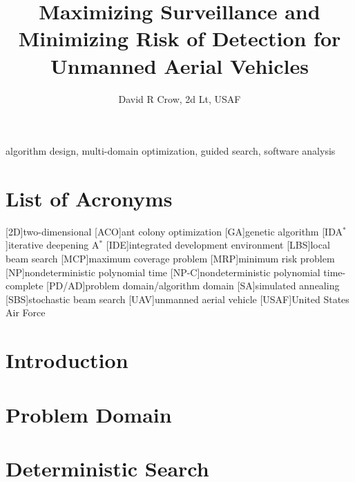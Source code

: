 \documentclass[journal]{IEEEtran}
\title{Maximizing Surveillance and Minimizing Risk of Detection for Unmanned Aerial Vehicles}
\author{David R Crow, 2d Lt, USAF}
\begin{document}
\maketitle



\begin{IEEEkeywords}
    algorithm design, multi-domain optimization, guided search, software analysis
\end{IEEEkeywords}

\tableofcontents

\section*{List of Acronyms}
\begin{acronym}[PD/AD]
    [2D]{two-dimensional}
    [ACO]{ant colony optimization}
    [GA]{genetic algorithm}
    [IDA$^*$]{iterative deepening A$^*$}
    [IDE]{integrated development environment}
    [LBS]{local beam search}
    [MCP]{maximum coverage problem}
    [MRP]{minimum risk problem}
    [NP]{nondeterministic polynomial time}
    [NP-C]{nondeterministic polynomial time-complete}
    [PD/AD]{problem domain/algorithm domain}
    [SA]{simulated annealing}
    [SBS]{stochastic beam search}
    [UAV]{unmanned aerial vehicle}
    [USAF]{United States Air Force}
\end{acronym}

\def\prob{MCP/MRP}
\def\probs{MCP/MRP }

\section{Introduction}\label{sec:introduction}


\section{Problem Domain}\label{sec:domain}


\section{Deterministic Search}\label{sec:deterministic}

\end{document}
